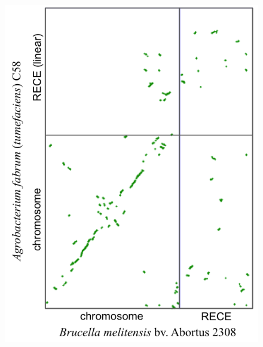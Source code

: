 \begin{figure}[H]
\begin{center}
\begin{minipage}{0.5\textwidth}
		\label{figsyntbruc1}
	\end{minipage}
\end{center}
\end{figure}

\begin{figure}[H]
\begin{center}
	\begin{minipage}{0.5\textwidth}
		\includegraphics[width=\textwidth]{./img/synteny/new/fig8_8g.png}
		\label{figsyntbruc7}
	\end{minipage}
	\begin{minipage}{0.5\textwidth}

\end{minipage}
\end{center}
\end{figure}

